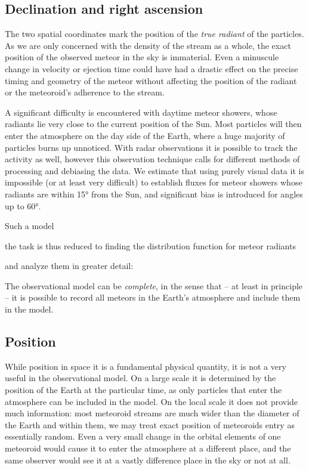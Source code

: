     \subsection{Declination and right ascension} \label{ios}
        The two spatial coordinates mark the position of the \emph{true radiant} of the particles.
        As we are only concerned with the density of the stream as a whole,
        the exact position of the observed meteor in the sky is immaterial.
        Even a minuscule change in velocity or ejection time could have had a drastic effect
        on the precise timing and geometry of the meteor without affecting
        the position of the radiant or the meteoroid's adherence to the stream.

        A significant difficulty is encountered with daytime meteor showers, whose radiants
        lie very close to the current position of the Sun.
        Most particles will then enter the atmosphere on the day side
        of the Earth, where a huge majority of particles burns up unnoticed.
        With radar observations it is possible to track the activity as well,
        however this observation technique calls for different methods of processing and debiasing the data.
        We estimate that using purely visual data it is impossible (or at least very difficult) to establish fluxes
        for meteor showers whose radiants are within \ang{15} from the Sun, and significant bias
        is introduced for angles up to \ang{60}.

    Such a model 

    the task is thus reduced to finding the distribution function for meteor radiants

    and analyze them in greater detail:

    The observational model can be \emph{complete}, in the sense that -- at least in principle -- it
    is possible to record all meteors in the Earth's atmosphere and include them in the model.

    \subsection{Position} \label{msp}
        While position in space it is a fundamental physical quantity,
        it is not a very useful in the observational model.
        On a large scale it is determined by the position of the Earth at the particular time,
        as only particles that enter the atmosphere can be included in the model.
        On the local scale it does not provide much information: most meteoroid streams
        are much wider than the diameter of the Earth and within them,
        we may treat exact position of meteoroids entry as essentially random.
        Even a very small change in the orbital elements of one meteoroid
        would cause it to enter the atmosphere at a different place,
        and the same observer would see it at a vastly difference place in the sky or not at all.

